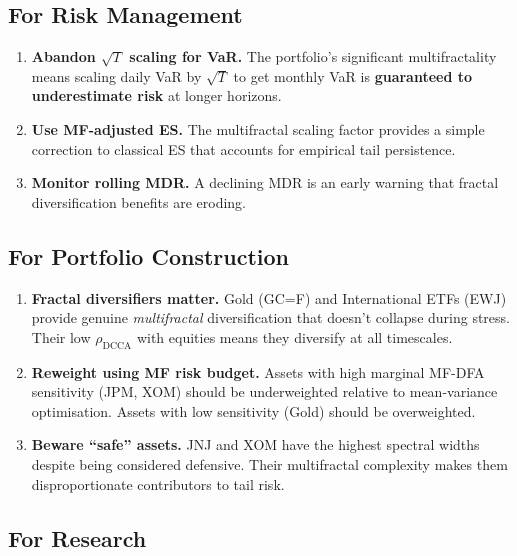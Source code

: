 \documentclass[11pt,a4paper]{article}
\begin{document}
\subsection{For Risk Management}

\begin{enumerate}[nosep]
\item \textbf{Abandon $\sqrt{T}$ scaling for VaR.} The portfolio's significant multifractality means scaling daily VaR by $\sqrt{T}$ to get monthly VaR is \textbf{guaranteed to underestimate risk} at longer horizons.

\item \textbf{Use MF-adjusted ES.} The multifractal scaling factor provides a simple correction to classical ES that accounts for empirical tail persistence.

\item \textbf{Monitor rolling MDR.} A declining MDR is an early warning that fractal diversification benefits are eroding.
\end{enumerate}

\subsection{For Portfolio Construction}

\begin{enumerate}[nosep, start=4]
\item \textbf{Fractal diversifiers matter.} Gold (GC=F) and International ETFs (EWJ) provide genuine \emph{multifractal} diversification that doesn't collapse during stress. Their low $\rho_{\text{DCCA}}$ with equities means they diversify at all timescales.

\item \textbf{Reweight using MF risk budget.} Assets with high marginal MF-DFA sensitivity (JPM, XOM) should be underweighted relative to mean-variance optimisation. Assets with low sensitivity (Gold) should be overweighted.

\item \textbf{Beware ``safe'' assets.} JNJ and XOM have the highest spectral widths despite being considered defensive. Their multifractal complexity makes them disproportionate contributors to tail risk.
\end{enumerate}

\subsection{For Research}
\end{document}

